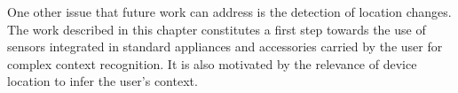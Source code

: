 One other issue that future work can address is the
detection of location changes. The work described in this chapter
constitutes a first step towards the use of sensors integrated in
standard appliances and accessories carried by the user for complex
context recognition. It is also motivated by the relevance of device
location to infer the user's context.



 
